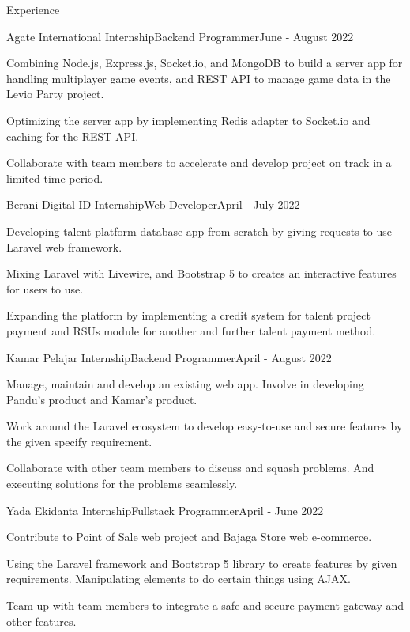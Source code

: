 \documentclass{article}
\newlength{\tabin}
\newlength{\secsep}
\newcommand{\lineunder}{\vspace*{-8pt} \\ \hspace*{-6pt} \hrulefill \\ \vspace*{-15pt}}
\newenvironment{tabbedsection}[1]{
  \begin{list}{}{
      \setlength{\itemsep}{0pt}
      \setlength{\labelsep}{0pt}
      \setlength{\labelwidth}{0pt}
      \setlength{\leftmargin}{\tabin}
      \setlength{\rightmargin}{\tabin}
      \setlength{\listparindent}{0pt}
      \setlength{\parsep}{0pt}
      \setlength{\parskip}{0pt}
      \setlength{\partopsep}{0pt}
      \setlength{\topsep}{#1}
    }
  \item[]
}{\end{list}}
\newenvironment{resume_section}[1]{
  \filbreak
  \vspace{2\secsep}
  \textsc{\large#1}
  \lineunder
  \begin{tabbedsection}{\secsep}
}{\end{tabbedsection}}
\newenvironment{subitems}{
  \renewcommand{\labelitemi}{-}
  \begin{itemize}
      \setlength{\labelsep}{1em}
}{\end{itemize}}
\newenvironment{resume_employer}[4]{
  \vspace{\secsep}
  \textbf{#1} \\ 
  \indent {\small #2} \hfill {\footnotesize#3 (#4)}
  \begin{tabbedsection}{0pt}
  \begin{subitems}
}{\end{subitems}\end{tabbedsection}}
\begin{document}
\begin{resume_section}{Experience}

    \begin{resume_employer}{Agate International Internship}{Backend Programmer}{}{June - August 2022}
        \item Combining Node.js, Express.js, Socket.io, and MongoDB to build a server app for handling multiplayer game events, and REST API to manage game data in the Levio Party project.
        \item Optimizing the server app by implementing Redis adapter to Socket.io and caching for the REST API.
        \item Collaborate with team members to accelerate and develop project on track in a limited time period.
    \end{resume_employer}

    \begin{resume_employer}{Berani Digital ID Internship}{Web Developer}{}{April - July 2022}
        \item Developing talent platform database app from scratch by giving requests to use Laravel web framework.
        \item Mixing Laravel with Livewire, and Bootstrap 5 to creates an interactive features for users to use.
        \item Expanding the platform by implementing a credit system for talent project payment and RSUs module for another and further talent payment method.
    \end{resume_employer}

    \begin{resume_employer}{Kamar Pelajar Internship}{Backend Programmer}{}{April - August 2022}
        \item Manage, maintain and develop an existing web app. Involve in developing Pandu's product and Kamar's product.
        \item Work around the Laravel ecosystem to develop easy-to-use and secure features by the given specify requirement.
        \item Collaborate with other team members to discuss and squash problems. And executing solutions for the problems seamlessly.
    \end{resume_employer}

    \begin{resume_employer}{Yada Ekidanta Internship}{Fullstack Programmer}{}{April - June 2022}
        \item Contribute to Point of Sale web project and Bajaga Store web e-commerce.
        \item Using the Laravel framework and Bootstrap 5 library to create features by given requirements. Manipulating elements to do certain things using AJAX.
        \item Team up with team members to integrate a safe and secure payment gateway and other features.
    \end{resume_employer}

\end{resume_section}
\end{document}
